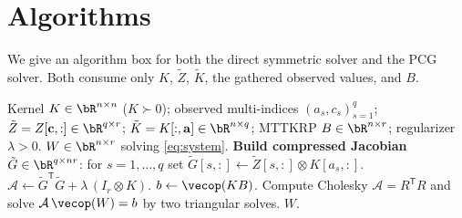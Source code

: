 \section{Algorithms}

We give an algorithm box for both the direct symmetric solver and the PCG solver.
Both consume only $K$, $\tilde Z$, $\tilde K$, the gathered observed values, and $B$.

\begin{algorithm}[H]
\caption{Direct symmetric solver for the mode-$k$ subproblem \eqref{eq:system}}
\label{alg:direct}
\begin{algorithmic}[1]
  \Require Kernel $K\in\bR^{n\times n}$ ($K\succ0$); observed multi-indices
    $(a_s,c_s)_{s=1}^q$; $\tilde Z=Z[\mathbf c,:]\in\bR^{q\times r}$;
    $\tilde K=K[:,\mathbf a]\in\bR^{n\times q}$; MTTKRP $B\in\bR^{n\times r}$;
    regularizer $\lambda>0$.
  \Ensure $W\in\bR^{n\times r}$ solving \eqref{eq:system}.
  \State \textbf{Build compressed Jacobian} $\tilde G\in\bR^{q\times nr}$:
    for $s=1,\dots,q$ set $\tilde G[s,:]\gets \tilde Z[s,:]\otimes K[a_s,:]$.
  \State $\mathcal A\gets \tilde G^{\mathsf T}\tilde G+\lambda\,(I_r\otimes K)$.
  \State $b\gets \vecop(KB)$.
  \State Compute Cholesky $\mathcal A=R^{\mathsf T}R$ and solve
    $\mathcal A\,\vecop(W)=b$ by two triangular solves.
  \State \Return $W$.
\end{algorithmic}
\end{algorithm}

